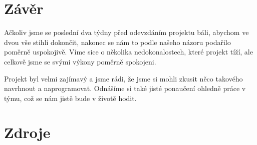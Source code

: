 \documentclass[11pt,a4paper]{article}
\begin{document}
\section{Závěr}
Ačkoliv jsme se poslední dva týdny před odevzdáním projektu báli, abychom ve dvou vše stihli dokončit, nakonec se nám to podle našeho názoru podařilo poměrně uspokojivě. Víme sice o několika nedokonalostech, které projekt tíží, ale celkově jsme se svými výkony poměrně spokojeni.

Projekt byl velmi zajímavý a jsme rádi, že jsme si mohli zkusit něco takového navrhnout a naprogramovat. Odnášíme si také jisté ponaučení ohledně práce v týmu, což se nám jistě bude v životě hodit.

\newpage

\section{Zdroje}
    
    

    
    

          
\end{document}
